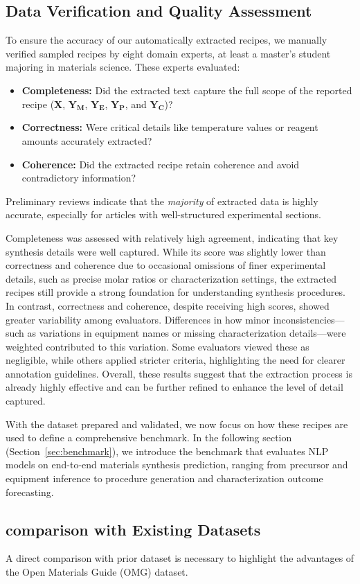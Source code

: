 \subsection{Data Verification and Quality Assessment}
To ensure the accuracy of our automatically extracted recipes, we manually verified sampled recipes by eight domain experts, at least a master's student majoring in materials science. These experts evaluated:

\begin{itemize}
    \item \textbf{Completeness:} Did the extracted text capture the full scope of the reported recipe (\textbf{X}, \(\mathbf{Y_M}\), \(\mathbf{Y_E}\), \(\mathbf{Y_P}\), and \(\mathbf{Y_C}\))?
    \item \textbf{Correctness:} Were critical details like temperature values or reagent amounts accurately extracted?
    \item \textbf{Coherence:} Did the extracted recipe retain coherence and avoid contradictory information?
\end{itemize}


Preliminary reviews indicate that the \emph{majority} of extracted data is highly accurate, especially for articles with well-structured experimental sections. 

Completeness was assessed with relatively high agreement, indicating that key synthesis details were well captured. While its score was slightly lower than correctness and coherence due to occasional omissions of finer experimental details, such as precise molar ratios or characterization settings, the extracted recipes still provide a strong foundation for understanding synthesis procedures. In contrast, correctness and coherence, despite receiving high scores, showed greater variability among evaluators. Differences in how minor inconsistencies—such as variations in equipment names or missing characterization details—were weighted contributed to this variation. Some evaluators viewed these as negligible, while others applied stricter criteria, highlighting the need for clearer annotation guidelines. Overall, these results suggest that the extraction process is already highly effective and can be further refined to enhance the level of detail captured.


With the dataset prepared and validated, we now focus on how these recipes are used to define a comprehensive benchmark. In the following section (Section~\ref{sec:benchmark}), we introduce the benchmark that evaluates NLP models on end-to-end materials synthesis prediction, ranging from precursor and equipment inference to procedure generation and characterization outcome forecasting.

\subsection{comparison with Existing Datasets}
A direct comparison with prior dataset is necessary to highlight the advantages of the Open Materials Guide (OMG) dataset.